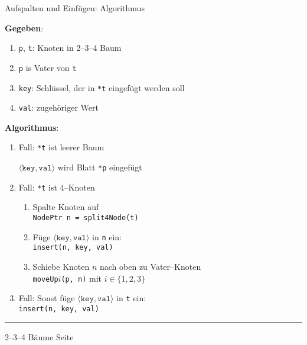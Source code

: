 \begin{slide}{}
\normalsize

\begin{center}
Aufspalten und Einf\"ugen: Algorithmus
\end{center}
\vspace*{0.5cm}

\footnotesize
\textbf{Gegeben}: 
\begin{enumerate}
\item \texttt{p}, \texttt{t}: Knoten in 2--3--4 Baum
\item \texttt{p} is Vater von \texttt{t}
\item \texttt{key}: Schl\"ussel, der in \texttt{*t} eingef\"ugt werden soll
\item \texttt{val}: zugeh\"origer Wert
\end{enumerate}
\textbf{Algorithmus}:
\begin{enumerate}
\item Fall: \texttt{*t} ist leerer Baum

      $\langle \mathtt{key}, \mathtt{val} \rangle$ wird Blatt \texttt{*p} eingef\"ugt
\item Fall: \texttt{*t} ist 4--Knoten
      \begin{enumerate}
      \item Spalte Knoten auf \\[0.3cm]
            \hspace*{1.3cm} \texttt{NodePtr n = split4Node(t)}
      \item F\"uge $\langle \mathtt{key}, \mathtt{val} \rangle$ in \texttt{n} ein: \\[0.3cm]
            \hspace*{1.3cm} \texttt{insert(n, key, val)}
      \item Schiebe Knoten $n$ nach oben zu Vater--Knoten \\[0.3cm]
            \hspace*{1.3cm} \texttt{moveUp}$i$\texttt{(p, n)} \quad mit $i \in \{1,2,3\}$
      \end{enumerate}
\item Fall: Sonst f\"uge $\langle \mathtt{key}, \mathtt{val} \rangle$ in \texttt{t} ein: \\[0.3cm]
      \hspace*{1.3cm} \texttt{insert(n, key, val)}
\end{enumerate}

\vspace*{\fill}
\tiny \addtocounter{mypage}{1}
\rule{17cm}{1mm}
2--3--4 B\"aume  \hspace*{\fill} Seite 
\end{slide}

